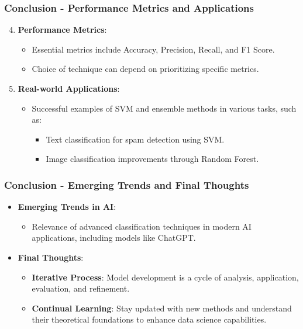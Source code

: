 \documentclass[aspectratio=169]{beamer}
\begin{document}
\begin{frame}[fragile]
    \frametitle{Conclusion - Performance Metrics and Applications}
    \begin{enumerate}
        \setcounter{enumi}{3}
        \item \textbf{Performance Metrics}:
            \begin{itemize}
                \item Essential metrics include Accuracy, Precision, Recall, and F1 Score.
                \item Choice of technique can depend on prioritizing specific metrics.
            \end{itemize}
        
        \item \textbf{Real-world Applications}:
            \begin{itemize}
                \item Successful examples of SVM and ensemble methods in various tasks, such as:
                \begin{itemize}
                    \item Text classification for spam detection using SVM.
                    \item Image classification improvements through Random Forest.
                \end{itemize}
            \end{itemize}
    \end{enumerate}
\end{frame}

\begin{frame}[fragile]
    \frametitle{Conclusion - Emerging Trends and Final Thoughts}
    \begin{itemize}
        \item \textbf{Emerging Trends in AI}:
            \begin{itemize}
                \item Relevance of advanced classification techniques in modern AI applications, including models like ChatGPT.
            \end{itemize}

        \item \textbf{Final Thoughts}:
            \begin{itemize}
                \item \textbf{Iterative Process}: Model development is a cycle of analysis, application, evaluation, and refinement.
                \item \textbf{Continual Learning}: Stay updated with new methods and understand their theoretical foundations to enhance data science capabilities.
            \end{itemize}
    \end{itemize}
\end{frame}
\end{document}
